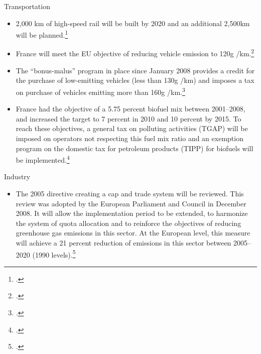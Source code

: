 \documentclass[10pt]{article}
\begin{document}
Transportation
\begin{itemize}
	\item 2,000 km of high-speed rail will be built by 2020 and an additional 2,500km will be planned.\footcite[][]{GrenellePolicies}
	\item France will meet the EU objective of reducing vehicle emission to 120g /km.\footcite[][]{GrenellePolicies}
	\item The “bonus-malus” program in place since January 2008 provides a credit for the purchase of low-emitting vehicles  (less than 130g /km) and imposes a tax on purchase of vehicles emitting more than 160g /km.\footcite[][]{GrenellePolicies}
	\item France had the objective of a 5.75 percent biofuel mix between 2001--2008, and increased the target to 7 percent in 2010 and 10 percent by 2015. To reach these objectives, a general tax on polluting activities (TGAP) will be imposed on operators not respecting this fuel mix ratio and an exemption program on the domestic tax for petroleum products (TIPP) for biofuels will be implemented.\footcite[][]{GrenellePolicies}
\end{itemize}



Industry
\begin{itemize}
	\item The 2005 directive creating a cap and trade system will be reviewed. This review was adopted by the European Parliament and Council in December 2008. It will allow the implementation period to be extended, to harmonize the system of quota allocation and to reinforce the objectives of reducing greenhouse gas emissions in this sector. At the European level, this measure will achieve a 21 percent reduction of emissions in this sector between 2005--2020 (1990 levels).\footcite[][]{GrenellePolicies}
\end{itemize}
\end{document}
